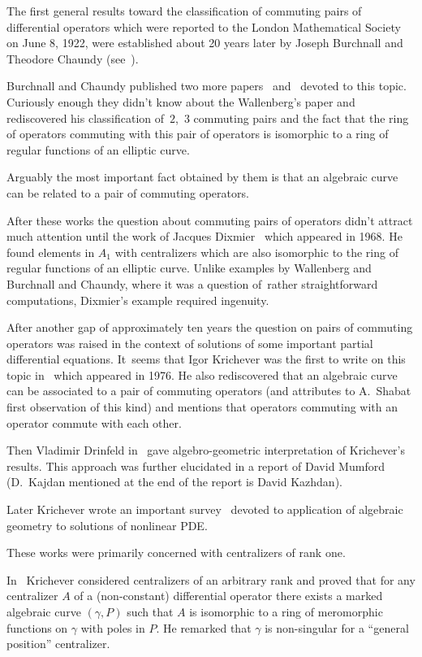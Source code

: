 \documentclass[pdftex]{sigma}
\numberwithin{equation}{section}
\newcommand{\ga}{\gamma}
\begin{document}
The first general results toward the classification of commuting pairs of differential operators which were reported to the London Mathematical Society on June 8, 1922, were established about 20 years later by Joseph Burchnall and Theodore Chaundy (see~\cite{BC1}).

Burchnall and Chaundy published two more papers~\cite{BC2} and~\cite{BC3} devoted to this topic. Curiously enough they didn't know about the Wallenberg's paper and rediscovered his classification of~$2$,~$3$ commuting pairs and the fact that the ring of operators commuting with this pair of operators is isomorphic to a ring of regular functions of an elliptic curve.

Arguably the most important fact obtained by them is that an algebraic curve can be related to a pair of commuting operators.

After these works the question about commuting pairs of operators didn't attract much attention until the work of Jacques Dixmier~\cite{D}
which appeared in 1968. He found elements in $A_1$ with centralizers which are also isomorphic to the ring of regular functions of an elliptic curve. Unlike examples by Wallenberg and Burchnall and Chaundy, where it was a question of~rather straightforward computations, Dixmier's example required ingenuity.

After another gap of approximately ten years the question on pairs of commuting operators was raised in the context of solutions of some important partial differential equations.
It~seems that Igor Krichever was the first to write on this topic in~\cite{K1} which appeared in 1976. He also rediscovered that an algebraic curve can be associated to a pair of commuting operators (and attributes to A.~Shabat first observation of this kind) and mentions that operators commuting with an operator commute with each other.

Then Vladimir Drinfeld in~\cite{Dr} gave algebro-geometric interpretation of Krichever's results. This approach was further elucidated in a report of David Mumford~\cite{Mum} (D.~Kajdan mentioned at the end
of the report is David Kazhdan).

Later Krichever wrote an important survey~\cite{K2} devoted to application of algebraic geometry to solutions of nonlinear PDE.

These works were primarily concerned with centralizers of rank one.

In~\cite{K3} Krichever considered centralizers of an arbitrary rank and proved that for any centralizer $A$ of a (non-constant) differential operator there exists a marked algebraic curve $(\ga, P)$
such that $A$ is isomorphic to a ring of meromorphic functions on $\ga$ with poles in $P$. He remarked that $\ga$ is non-singular for a ``general position'' centralizer.
\end{document}
